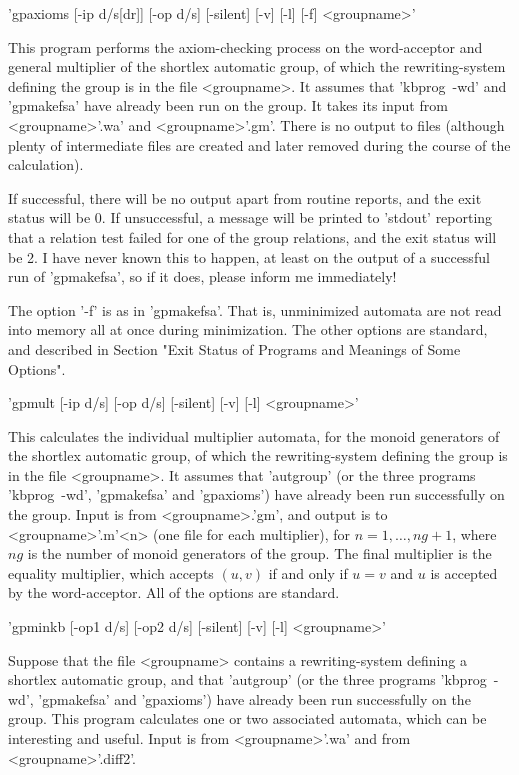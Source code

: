 'gpaxioms [-ip d/s[dr]] [-op d/s] [-silent] [-v] [-l] [-f] <groupname>'

This program performs the axiom-checking process on the word-acceptor and
general multiplier of the shortlex automatic group,
of which the rewriting-system defining the group is in the file <groupname>.
It assumes that 'kbprog\ -wd' and 'gpmakefsa' have already been run on the
group.
It takes its input from <groupname>'.wa' and <groupname>'.gm'. 
There is no output to files (although plenty of intermediate files are
created and later removed during the course of the calculation).

If successful, there will be no output apart from routine reports, and the exit
status will be 0. If unsuccessful, a message will be printed to 'stdout'
reporting that a relation test failed for one of the group relations, and
the exit status will be 2. I have never known this to happen, at least on
the output of a successful run of 'gpmakefsa', so if it does, please inform
me immediately!

The option '-f' is as in 'gpmakefsa'. That is, unminimized automata are not
read into memory all at once during minimization.
The other options are standard, and described in Section 
"Exit Status of Programs and Meanings of Some Options".

'gpmult [-ip d/s] [-op d/s] [-silent] [-v] [-l] <groupname>'

This calculates the individual multiplier automata, for the monoid
generators of the shortlex automatic group, of which the rewriting-system
defining the group is in the file <groupname>.
It assumes that 'autgroup' (or the three programs 'kbprog\ -wd', 'gpmakefsa'
and 'gpaxioms') have already been run successfully on the group.
Input is from <groupname>.'gm', and output is to <groupname>'.m'<n>
(one file for each multiplier), for $n = 1, \ldots , ng+1$, where $ng$ is
the number of monoid generators of the group. The final multiplier is
the equality multiplier, which accepts $(u,v)$ if and only if $u = v$ and
$u$ is accepted by the word-acceptor.
All of the options are standard.

'gpminkb [-op1 d/s] [-op2 d/s] [-silent] [-v] [-l] <groupname>'

Suppose that the file <groupname> contains a rewriting-system
defining a shortlex automatic group,
and that 'autgroup' (or the three programs 'kbprog\ -wd', 'gpmakefsa'
and 'gpaxioms') have already been run successfully on the group.
This program calculates one or two associated automata, which can be
interesting and useful. Input is from <groupname>'.wa' and from
<groupname>'.diff2'.

